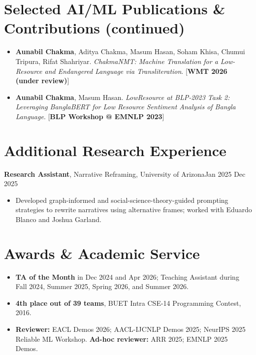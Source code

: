 \documentclass[11pt]{extarticle}
\newcommand{\entryheading}[2]{%
  {\normalsize #1}\hfill{\small #2}\par
}
\begin{document}
\section*{Selected AI/ML Publications \& Contributions (continued)}
\begin{itemize}
  \item {\normalsize \textbf{Aunabil Chakma}, Aditya Chakma, Masum Hasan, Soham Khisa, Chumui Tripura, Rifat Shahriyar. \textit{ChakmaNMT: Machine Translation for a Low-Resource and Endangered Language via Transliteration}. [\textbf{WMT 2026 (under review)}]}
  \item {\normalsize \textbf{Aunabil Chakma}, Masum Hasan. \textit{LowResource at BLP-2023 Task 2: Leveraging BanglaBERT for Low Resource Sentiment Analysis of Bangla Language}. [\textbf{BLP Workshop @ EMNLP 2023}]}
\end{itemize}

\section*{Additional Research Experience}
\entryheading{\textbf{Research Assistant}, Narrative Reframing, University of Arizona}{Jan 2025 \textendash{} Dec 2025}
\begin{itemize}
  \item {\small Developed graph-informed and social-science-theory-guided prompting strategies to rewrite narratives using alternative frames; worked with Eduardo Blanco and Joshua Garland.}
\end{itemize}

\section*{Awards \& Academic Service}
\begin{itemize}
  \item {\normalsize\textbf{TA of the Month}} {\small in Dec 2024 and Apr 2026; Teaching Assistant during Fall 2024, Summer 2025, Spring 2026, and Summer 2026.}
  \item {\normalsize\textbf{4th place out of 39 teams}}{\small, BUET Intra CSE-14 Programming Contest, 2016.}
  \item {\normalsize\textbf{Reviewer:}} {\small EACL Demos 2026; AACL-IJCNLP Demos 2025; NeurIPS 2025 Reliable ML Workshop. \textbf{Ad-hoc reviewer:} ARR 2025; EMNLP 2025 Demos.}
\end{itemize}
\end{document}
